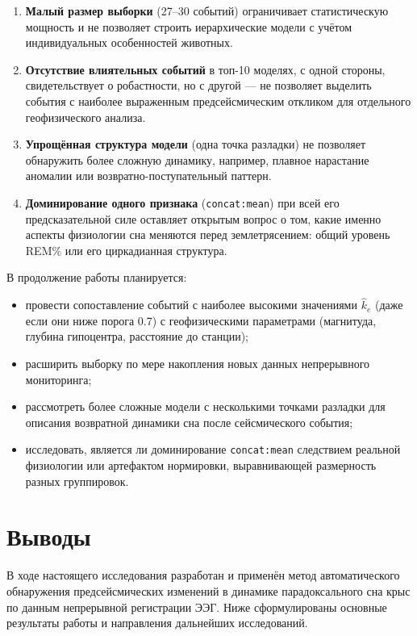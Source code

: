 \documentclass[14pt]{mmcs_article}
\begin{document}
	\begin{enumerate}
		\item \textbf{Малый размер выборки} (27--30 событий)
		ограничивает статистическую мощность и не
		позволяет строить иерархические модели с учётом
		индивидуальных особенностей животных.
		
		\item \textbf{Отсутствие влиятельных событий} в топ-10
		моделях, с одной стороны, свидетельствует о
		робастности, но с другой — не позволяет выделить
		события с наиболее выраженным предсейсмическим
		откликом для отдельного геофизического анализа.
		
		\item \textbf{Упрощённая структура модели} (одна точка
		разладки) не позволяет обнаружить более сложную
		динамику, например, плавное нарастание аномалии
		или возвратно-поступательный паттерн.
		
		\item \textbf{Доминирование одного признака}
		(\texttt{concat:mean}) при всей его
		предсказательной силе оставляет открытым вопрос о
		том, какие именно аспекты физиологии сна меняются
		перед землетрясением: общий уровень REM\% или его
		циркадианная структура.
	\end{enumerate}
	
	В продолжение работы планируется:
	
	\begin{itemize}
		\item провести сопоставление событий с наиболее высокими
		значениями $\hat{k}_e$ (даже если они ниже порога
		0.7) с геофизическими параметрами (магнитуда,
		глубина гипоцентра, расстояние до станции);
		\item расширить выборку по мере накопления новых данных
		непрерывного мониторинга;
		\item рассмотреть более сложные модели с несколькими
		точками разладки для описания возвратной динамики
		сна после сейсмического события;
		\item исследовать, является ли доминирование
		\texttt{concat:mean} следствием реальной
		физиологии или артефактом нормировки,
		выравнивающей размерность разных группировок.
	\end{itemize}
	
	
	\section*{Выводы}
	
	В ходе настоящего исследования разработан и применён метод
	автоматического обнаружения предсейсмических изменений в
	динамике парадоксального сна крыс по данным непрерывной
	регистрации ЭЭГ. Ниже сформулированы основные результаты
	работы и направления дальнейших исследований.
	
\end{document}
